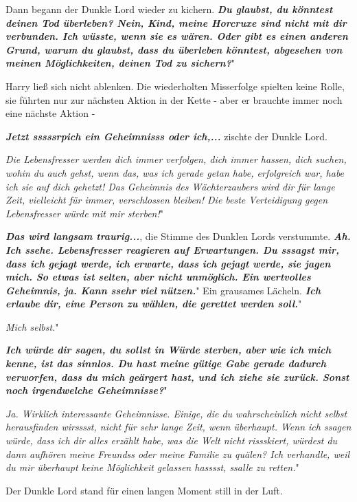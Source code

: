 Dann begann der Dunkle Lord wieder zu kichern. \glqq{}\textbf{\emph{Du glaubst,
du könntest deinen Tod überleben? Nein, Kind, meine Horcruxe sind nicht mit dir
verbunden. Ich wüsste, wenn sie es wären. Oder gibt es einen anderen Grund,
warum du glaubst, dass du überleben könntest, abgesehen von meinen
Möglichkeiten, deinen Tod zu sichern?}}"

Harry ließ sich nicht ablenken. Die wiederholten Misserfolge spielten keine
Rolle, sie führten nur zur nächsten Aktion in der Kette - aber er brauchte immer
noch eine nächste Aktion -

\glqq{}\textbf{\emph{Jetzt sssssrpich ein Geheimnisss oder ich,...}}\grqq{}
zischte der Dunkle Lord.

\glqq{}\emph{Die Lebensfresser werden dich immer verfolgen, dich immer hassen,
dich suchen, wohin du auch gehst, wenn das, was ich gerade getan habe,
erfolgreich war, habe ich sie auf dich gehetzt! Das Geheimnis des Wächterzaubers
wird dir für lange Zeit, vielleicht für immer, verschlossen bleiben! Die beste
Verteidigung gegen Lebensfresser würde mit mir sterben!}"

\glqq{}\textbf{\emph{Das wird langsam traurig...}}\grqq{}, die Stimme des Dunklen
Lords verstummte. \glqq{}\textbf{\emph{Ah. Ich ssehe. Lebensfresser reagieren auf
Erwartungen. Du sssagst mir, dass ich gejagt werde, ich erwarte, dass ich gejagt
werde, sie jagen mich. So etwas ist selten, aber nicht unmöglich. Ein wertvolles
Geheimnis, ja. Kann ssehr viel nützen.}}" Ein grausames Lächeln. \glqq{}
\textbf{\emph{Ich erlaube dir, eine Person zu wählen, die gerettet werden
soll.}}"

\glqq{}\emph{Mich selbst.}"

\glqq{}\textbf{\emph{Ich würde dir sagen, du sollst in Würde sterben, aber wie
ich mich kenne, ist das sinnlos. Du hast meine gütige Gabe gerade dadurch
verworfen, dass du mich geärgert hast, und ich ziehe sie zurück. Sonst noch
irgendwelche Geheimnisse?}}"

\glqq{}\emph{Ja. Wirklich interessante Geheimnisse. Einige, die du wahrscheinlich
nicht selbst herausfinden wirsssst, nicht für sehr lange Zeit, wenn überhaupt.
Wenn ich ssagen würde, dass ich dir alles erzählt habe, was die Welt nicht
rissskiert, würdest du dann aufhören meine Freundss oder meine Familie zu
quälen? Ich verhandle, weil du mir überhaupt keine Möglichkeit gelassen hasssst,
ssalle zu retten.}"

Der Dunkle Lord stand für einen langen Moment still in der Luft.

